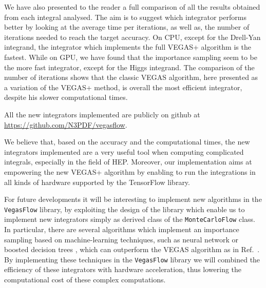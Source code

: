 \documentclass[../main/main.tex]{subfiles}
\begin{document}
We have also presented to the reader a full comparison of all the results obtained from each integral analysed. The aim is to suggest which integrator performs better by looking at the average time per iterations, as well as, the number of iterations needed to reach the target accuracy. On CPU, except for the Drell-Yan integrand, the integrator which implements the full VEGAS+ algorithm is the fastest. While on GPU, we have found that the importance sampling seem to be the more fast integrator, except for the Higgs integrand.
The comparison of the number of iterations shows that the classic VEGAS algorithm, here presented as a variation of the VEGAS+ method, is overall the most efficient 
integrator, despite his slower computational times. 

All the new integrators implemented are publicly on github at \url{https://github.com/N3PDF/vegasflow}.

We believe that, based on the accuracy and the computational times, the new integrators implemented are a very useful tool when computing complicated integrals, especially in the field of HEP. Moreover, our implementation aims at empowering the new VEGAS+ algorithm by enabling to run the integrations in all kinds of hardware supported by the TensorFlow library.

For future developments it will be interesting to implement new algorithms in the \texttt{VegasFlow} library, by exploiting the design of the library which enable us to implement new integrators simply as derived class of the \texttt{MonteCarloFlow} class. In particular, there are several algorithms which implement an importance sampling based on machine-learning techniques, such as neural network or boosted decision trees \cite{Bendavid:2017zhk}, which can outperform the VEGAS algorithm as in Ref.~\cite{Gao:2020vdv}. 
By implementing these techniques in the \texttt{VegasFlow} library we will combined the efficiency of these integrators with hardware acceleration, thus lowering the computational cost of these complex computations.
\end{document}
